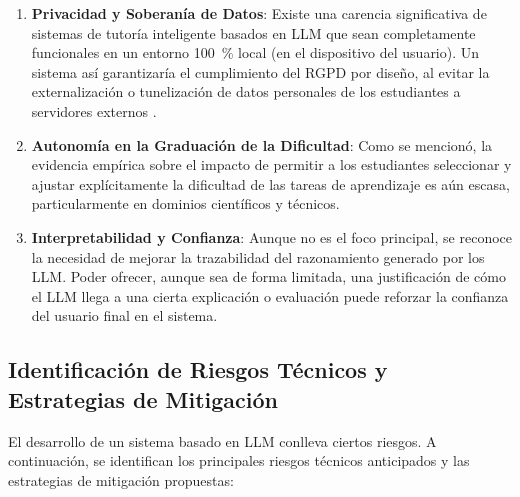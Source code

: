 \begin{enumerate}[label=\textbf{B\arabic*.},leftmargin=*, wide, labelwidth=!, labelindent=0pt]
  \item \textbf{Privacidad y Soberanía de Datos}: Existe una carencia significativa de sistemas de tutoría inteligente basados en LLM que sean completamente funcionales en un entorno \SI{100}{\percent} local (en el dispositivo del usuario). Un sistema así garantizaría el cumplimiento del RGPD por diseño, al evitar la externalización o tunelización de datos personales de los estudiantes a servidores externos \cite{Feretzakis2025}.
  \item \textbf{Autonomía en la Graduación de la Dificultad}: Como se mencionó, la evidencia empírica sobre el impacto de permitir a los estudiantes seleccionar y ajustar explícitamente la dificultad de las tareas de aprendizaje es aún escasa, particularmente en dominios científicos y técnicos.
  \item \textbf{Interpretabilidad y Confianza}: Aunque no es el foco principal, se reconoce la necesidad de mejorar la trazabilidad del razonamiento generado por los LLM. Poder ofrecer, aunque sea de forma limitada, una justificación de cómo el LLM llega a una cierta explicación o evaluación puede reforzar la confianza del usuario final en el sistema.
\end{enumerate}

\subsection{Identificación de Riesgos Técnicos y Estrategias de Mitigación}
\label{ssec:riesgos_tecnicos_mitigacion}

El desarrollo de un sistema basado en LLM conlleva ciertos riesgos. A continuación, se identifican los principales riesgos técnicos anticipados y las estrategias de mitigación propuestas:

